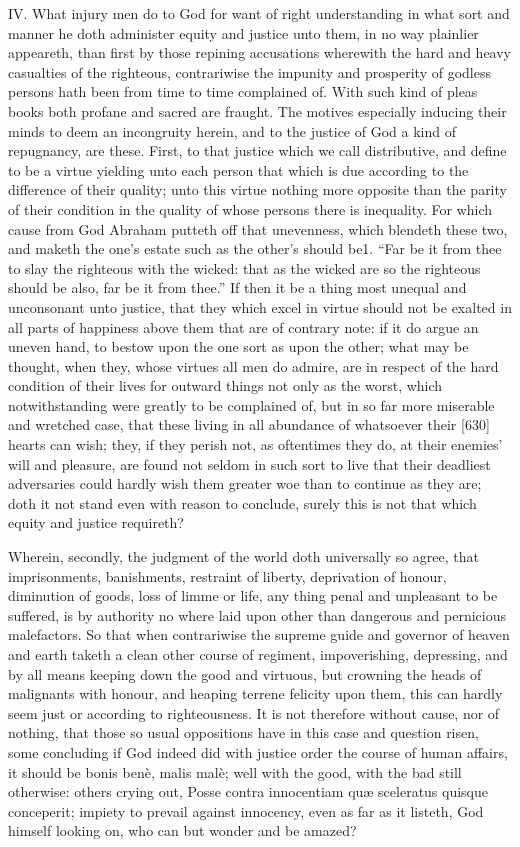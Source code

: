 IV.
What injury men do to God for want of right understanding in what sort and manner he doth administer equity and justice unto them, in no way plainlier appeareth, than first by those repining accusations wherewith the hard and heavy casualties of the righteous, contrariwise the impunity and prosperity of godless persons hath been from time to time complained of. With such kind of pleas books both profane and sacred are fraught. The motives especially inducing their minds to deem an incongruity herein, and to the justice of God a kind of repugnancy, are these. First, to that justice which we call distributive, and define to be a virtue yielding unto each person that which is due according to the difference of their quality; unto this virtue nothing more opposite than the parity of their condition in the quality of whose persons there is inequality. For which cause from God Abraham putteth off that unevenness, which blendeth these two, and maketh the one’s estate such as the other’s should be1. “Far be it from thee to slay the righteous with the wicked: that as the wicked are so the righteous should be also, far be it from thee.” If then it be a thing most unequal and unconsonant unto justice, that they which excel in virtue should not be exalted in all parts of happiness above them that are of contrary note: if it do argue an uneven hand, to bestow upon the one sort as upon the other; what may be thought, when they, whose virtues all men do admire, are in respect of the hard condition of their lives for outward things not only as the worst, which notwithstanding were greatly to be complained of, but in so far more miserable and wretched case, that these living in all abundance of whatsoever their [630] hearts can wish; they, if they perish not, as oftentimes they do, at their enemies’ will and pleasure, are found not seldom in such sort to live that their deadliest adversaries could hardly wish them greater woe than to continue as they are; doth it not stand even with reason to conclude, surely this is not that which equity and justice requireth?

Wherein, secondly, the judgment of the world doth universally so agree, that imprisonments, banishments, restraint of liberty, deprivation of honour, diminution of goods, loss of limme or life, any thing penal and unpleasant to be suffered, is by authority no where laid upon other than dangerous and pernicious malefactors. So that when contrariwise the supreme guide and governor of heaven and earth taketh a clean other course of regiment, impoverishing, depressing, and by all means keeping down the good and virtuous, but crowning the heads of malignants with honour, and heaping terrene felicity upon them, this can hardly seem just or according to righteousness. It is not therefore without cause, nor of nothing, that those so usual oppositions have in this case and question risen, some concluding if God indeed did with justice order the course of human affairs, it should be bonis benè, malis malè; well with the good, with the bad still otherwise: others crying out, Posse contra innocentiam quæ sceleratus quisque conceperit; impiety to prevail against innocency, even as far as it listeth, God himself looking on, who can but wonder and be amazed?

